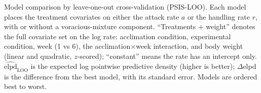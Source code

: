 \begin{table}[h]\centering
\caption{Model comparison by leave-one-out cross-validation (PSIS-LOO). Each model
places the treatment covariates on either the attack rate $a$ or the handling
rate $r$, with or without a voracious-mixture component. ``Treatments + weight''
denotes the full covariate set on the log rate: acclimation condition,
experimental condition, week (1 vs 6), the acclimation$\times$week interaction, and
body weight (linear and quadratic, $z$-scored); ``constant'' means the rate has an
intercept only. $\widehat{\mathrm{elpd}}_{\mathrm{LOO}}$ is the expected log
pointwise predictive density (higher is better); $\Delta$elpd is the difference
from the best model, with its standard error. Models are ordered best to worst.
\label{tab:model_comparison}}
\end{table}
